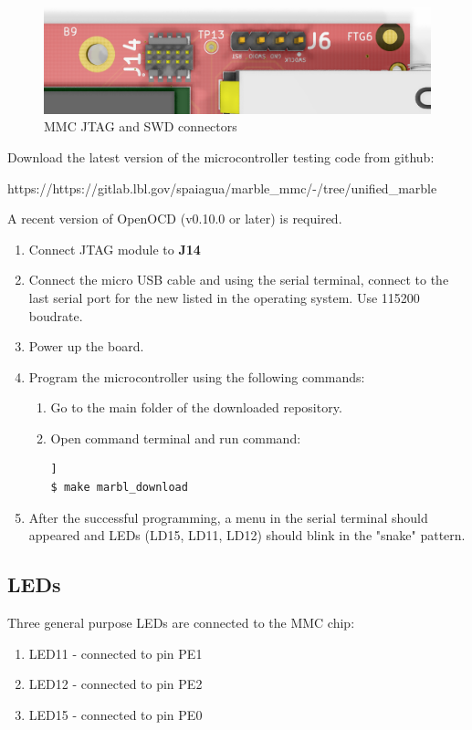 \documentclass[12pt,oneside,a4]{article}
\begin{document}
\begin{figure}[H]
\begin{center}
\includegraphics[width=1\linewidth]{mmcjtagswd.png}
 \caption{MMC JTAG and SWD connectors}\label{mmcjtagswd}
\end{center}
\end{figure}

Download the latest version of the microcontroller testing code from github:
\begin{leftbar}
https://https://gitlab.lbl.gov/spaiagua/marble\_mmc/-/tree/unified\_marble
\end{leftbar}

A recent version of OpenOCD (v0.10.0 or later) is required. 
\begin{enumerate}
	\item Connect JTAG module to \textbf{J14}
	\item Connect the micro USB cable and using the serial terminal, connect to the last serial port for the new listed in the operating system. Use 115200 boudrate.
	\item Power up the board.
	\item Program the microcontroller using the following commands:
	\begin{enumerate}
	\item Go to the main folder of the downloaded repository.
	\item Open command terminal and run command:
	\begin{lstlisting}[backgroundcolor = \color{Gainsboro}, language=bash, frame=none]]
$ make marbl_download
	\end{lstlisting}
	\end{enumerate}
	\item After the successful programming, a menu in the serial terminal should appeared and LEDs (LD15, LD11, LD12) should blink in the "snake" pattern.
\end{enumerate}
\subsection{LEDs}
Three general purpose LEDs are connected to the MMC chip:
\begin{enumerate}
	\item LED11 - connected to pin PE1
	\item LED12 - connected to pin PE2
	\item LED15 - connected to pin PE0
\end{enumerate}
\end{document}
